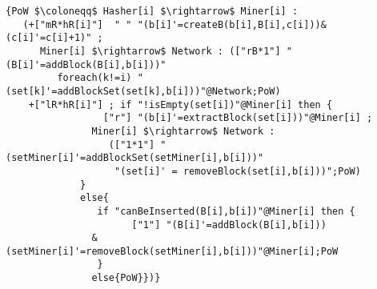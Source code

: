 \begin{lstlisting}[style=chor-color,breaklines=true, postbreak=\mbox{\textcolor{red}{$\hookrightarrow$}\space},caption={Choreography for the Proof of Work Bitcoin Protocol},captionpos=b,label={ex3-code}]
   {PoW $\coloneqq$ Hasher[i] $\rightarrow$ Miner[i] :
   (+["mR*hR[i]"]  " " "(b[i]'=createB(b[i],B[i],c[i]))&(c[i]'=c[i]+1)" ; 
      Miner[i] $\rightarrow$ Network : (["rB*1"] "(B[i]'=addBlock(B[i],b[i]))"   
         foreach(k!=i) "(set[k]'=addBlockSet(set[k],b[i]))"@Network;PoW)
    +["lR*hR[i]"] ; if "!isEmpty(set[i])"@Miner[i] then { 
                 ["r"] "(b[i]'=extractBlock(set[i]))"@Miner[i] ;  
               Miner[i] $\rightarrow$ Network : 
                  (["1*1"] "(setMiner[i]'=addBlockSet(setMiner[i],b[i]))"
                   "(set[i]' = removeBlock(set[i],b[i]))";PoW) 
             }
             else{
                if "canBeInserted(B[i],b[i])"@Miner[i] then { 
                      ["1"] "(B[i]'=addBlock(B[i],b[i]))
               &(setMiner[i]'=removeBlock(setMiner[i],b[i]))"@Miner[i];PoW 
                }
               else{PoW}})} 
   \end{lstlisting}
   \vspace{-0.15cm}

